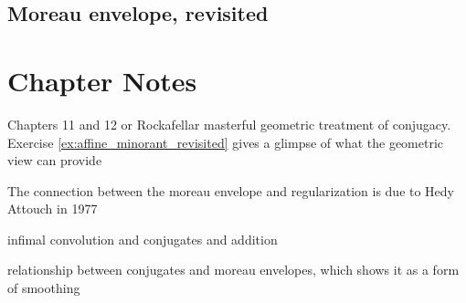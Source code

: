 \subsection{Moreau envelope, revisited}
\label{sec:moreau_revisited}

\SkipTocEntry\section*{Chapter Notes}

Chapters 11 and 12 or Rockafellar masterful geometric treatment of
conjugacy. Exercise \ref{ex:affine_minorant_revisited} gives a glimpse of what
the geometric view can provide

The connection between the moreau envelope and regularization is due to Hedy
Attouch in 1977  

infimal convolution and conjugates and addition

relationship between conjugates and moreau envelopes, which shows it as a form
of smoothing 

\clearpage

